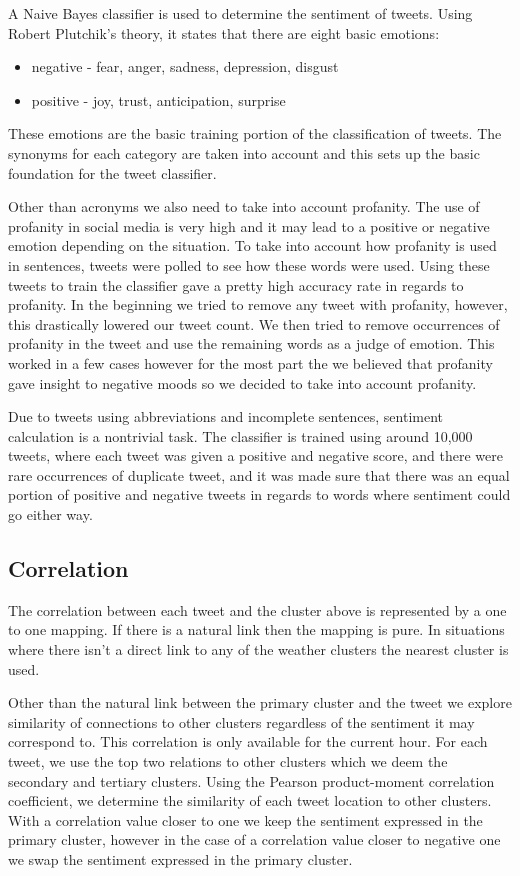 \documentclass[journal]{vgtc}                %
\begin{document}
A Naive Bayes classifier is used to determine the sentiment of tweets.
Using Robert Plutchik's theory, it states that there are eight basic emotions: 
\begin{itemize}
\item negative - fear, anger, sadness, depression, disgust
\item positive - joy, trust, anticipation, surprise
\end{itemize}
    
These emotions are the basic training portion of the classification of tweets. The synonyms for each category are taken into account and this sets up the basic foundation for the tweet classifier. 

Other than acronyms we also need to take into account profanity. The use of profanity in social media is very high and it may lead to a positive or negative emotion depending on the situation. To take into account how profanity is used in sentences, tweets were polled to see how these words were used. Using these tweets to train the classifier gave a pretty high accuracy rate in regards to profanity. In the beginning we tried to remove any tweet with profanity, however, this drastically lowered our tweet count. We then tried to remove occurrences of profanity in the tweet and use the remaining words as a judge of emotion. This worked in a few cases however for the most part the we believed that profanity gave insight to negative moods so we decided to take into account profanity.

Due to tweets using abbreviations and incomplete sentences, sentiment calculation is a nontrivial task. The classifier is trained using around 10,000 tweets, where each tweet was given a positive and negative score, and there were rare occurrences of duplicate tweet, and it was made sure that there was an equal portion of positive and negative tweets in regards to words where sentiment could go either way. 


\subsection{Correlation}
The correlation between each tweet and the cluster above is represented by a one to one mapping. If there is a natural link then the mapping is pure. In situations where there isn't a direct link to any of the weather clusters the nearest cluster is used.

Other than the natural link between the primary cluster and the tweet we explore similarity of connections to other clusters regardless of the sentiment it may correspond to. This correlation is only available for the current hour. For each tweet, we use the top two relations to other clusters which we deem the secondary and tertiary clusters. Using the Pearson product-moment correlation coefficient, we determine the similarity of each tweet location to other clusters. With a correlation value closer to one we keep the sentiment expressed in the primary cluster, however in the case of a correlation value closer to negative one we swap the sentiment expressed in the primary cluster.
\end{document}
